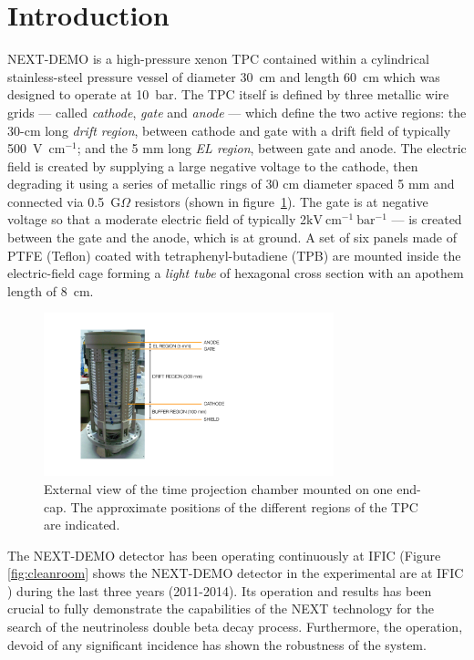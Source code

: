 \section{Introduction}
NEXT-DEMO is a high-pressure xenon TPC contained within a cylindrical stainless-steel pressure vessel of diameter 30~cm and length 60~cm which was designed to operate at 10~bar. The TPC itself is defined by three metallic wire grids --- called \emph{cathode}, \emph{gate} and \emph{anode} --- which define the two active regions: the 30-cm long \emph{drift region}, between cathode and gate with a  drift field of typically 500~V~cm$^{-1}$; and the 5 mm long \emph{EL region}, between gate and anode.  The electric field is created by supplying a large negative voltage to the cathode, then degrading it using a series of metallic rings of 30 cm diameter spaced 5 mm and connected via 0.5~G$\Omega$ resistors (shown in figure~\ref{fig:TPC}).  The gate is at negative voltage so that a moderate electric field of typically 2$\mathrm{kV~cm^{-1}~bar^{-1}}$ --- is created between the gate and the anode, which is at ground. A set of six panels made of PTFE (Teflon) coated with tetraphenyl-butadiene (TPB) are mounted inside the electric-field cage forming a \emph{light tube} of hexagonal cross section with an apothem length of 8~cm. 


\begin{figure}
\centering
\includegraphics[width=0.75\textwidth]{img/FieldCage.pdf}
\caption{External view of the time projection chamber mounted on one end-cap. The approximate positions of the different regions of the TPC are indicated.} \label{fig:TPC}
\end{figure}


The NEXT-DEMO detector has been operating continuously at IFIC (Figure \ref{fig:cleanroom} shows the NEXT-DEMO detector in the experimental are at IFIC ) during the last three years (2011-2014). Its operation and results has been crucial to fully demonstrate the capabilities of the NEXT technology for the search of the neutrinoless double beta decay process. Furthermore, the operation, devoid of any significant incidence has shown the robustness of the system. 

